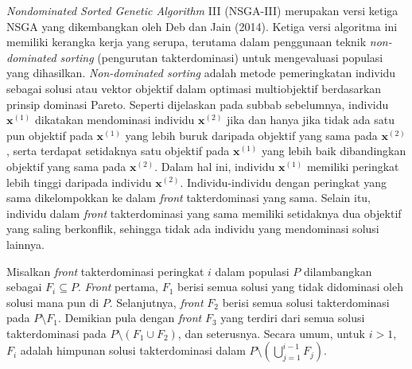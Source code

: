 \textit{Nondominated Sorted Genetic Algorithm} III (NSGA-III) merupakan versi ketiga NSGA yang dikembangkan oleh Deb dan Jain (2014). Ketiga versi algoritma ini memiliki kerangka kerja yang serupa, terutama dalam penggunaan teknik \textit{non-dominated sorting} (pengurutan takterdominasi) untuk mengevaluasi populasi yang dihasilkan. \textit{Non-dominated sorting} adalah metode pemeringkatan individu sebagai solusi atau vektor objektif dalam optimasi multiobjektif berdasarkan prinsip dominasi Pareto. Seperti dijelaskan pada subbab sebelumnya, individu $\mathbf{x}^{(1)}$ dikatakan mendominasi individu $\mathbf{x}^{(2)}$ jika dan hanya jika tidak ada satu pun objektif pada $\mathbf{x}^{(1)}$ yang lebih buruk daripada objektif yang sama pada $\mathbf{x}^{(2)}$, serta terdapat setidaknya satu objektif pada $\mathbf{x}^{(1)}$ yang lebih baik dibandingkan objektif yang sama pada $\mathbf{x}^{(2)}$. Dalam hal ini, individu $\mathbf{x}^{(1)}$ memiliki peringkat lebih tinggi daripada individu $\mathbf{x}^{(2)}$. Individu-individu dengan peringkat yang sama dikelompokkan ke dalam \textit{front} takterdominasi yang sama. Selain itu, individu dalam \textit{front} takterdominasi yang sama memiliki setidaknya dua objektif yang saling berkonflik, sehingga tidak ada individu yang mendominasi solusi lainnya.

Misalkan \textit{front} takterdominasi peringkat $i$ dalam populasi $P$ dilambangkan sebagai $F_i \subseteq P$. \textit{Front} pertama, $F_1$ berisi semua solusi yang tidak didominasi oleh solusi mana pun di $P$. Selanjutnya, \textit{front} $F_2$ berisi semua solusi takterdominasi pada $P \setminus F_1$. Demikian pula dengan \textit{front} $F_3$ yang terdiri dari semua solusi takterdominasi pada $P \setminus (F_1 \cup F_2)$, dan seterusnya. Secara umum, untuk $i > 1$, $F_i$ adalah himpunan solusi takterdominasi dalam $P\setminus(\bigcup_{j=1}^{i-1} F_j)$.  

